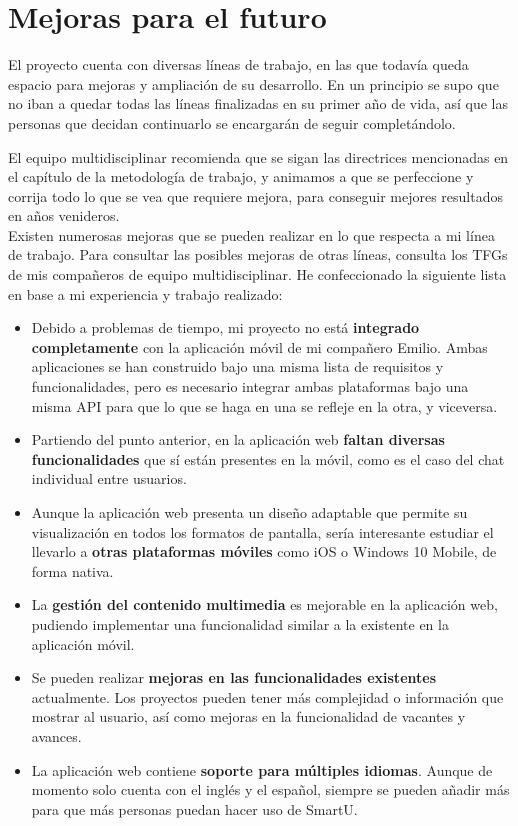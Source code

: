 \section{Mejoras para el futuro}
El proyecto cuenta con diversas líneas de trabajo, en las que todavía queda espacio para mejoras y ampliación de su desarrollo. En un principio se supo que no iban a quedar todas las líneas finalizadas en su primer año de vida, así que las personas que decidan continuarlo se encargarán de seguir completándolo.

El equipo multidisciplinar recomienda que se sigan las directrices mencionadas en el capítulo de la metodología de trabajo, y animamos a que se perfeccione y corrija todo lo que se vea que requiere mejora, para conseguir mejores resultados en años venideros.\\

Existen numerosas mejoras que se pueden realizar en lo que respecta a mi línea de trabajo. Para consultar las posibles mejoras de otras líneas, consulta los TFGs de mis compañeros de equipo multidisciplinar. He confeccionado la siguiente lista en base a mi experiencia y trabajo realizado:

\begin{itemize}
    \item Debido a problemas de tiempo, mi proyecto no está \textbf{integrado completamente} con la aplicación móvil de mi compañero Emilio. Ambas aplicaciones se han construido bajo una misma lista de requisitos y funcionalidades, pero es necesario integrar ambas plataformas bajo una misma API para que lo que se haga en una se refleje en la otra, y viceversa.
    \item Partiendo del punto anterior, en la aplicación web \textbf{faltan diversas funcionalidades} que sí están presentes en la móvil, como es el caso del chat individual entre usuarios.
    \item Aunque la aplicación web presenta un diseño adaptable que permite su visualización en todos los formatos de pantalla, sería interesante estudiar el llevarlo a \textbf{otras plataformas móviles} como iOS o Windows 10 Mobile, de forma nativa.
    \item La \textbf{gestión del contenido multimedia} es mejorable en la aplicación web, pudiendo implementar una funcionalidad similar a la existente en la aplicación móvil.
    \item Se pueden realizar \textbf{mejoras en las funcionalidades existentes} actualmente. Los proyectos pueden tener más complejidad o información que mostrar al usuario, así como mejoras en la funcionalidad de vacantes y avances.
    \item La aplicación web contiene \textbf{soporte para múltiples idiomas}. Aunque de momento solo cuenta con el inglés y el español, siempre se pueden añadir más para que más personas puedan hacer uso de SmartU.
\end{itemize}
